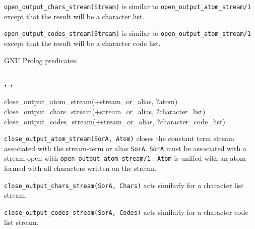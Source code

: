 \texttt{open\_output\_chars\_stream(Stream)} is similar to
\texttt{open\_output\_atom\_stream/1} except that the result will be a
character list.

\texttt{open\_output\_codes\_stream(Stream)} is similar to
\texttt{open\_output\_atom\_stream/1} except that the result will be a
character code list.

\begin{PlErrors}


\end{PlErrors}

\Portability

GNU Prolog predicates.

\subsubsection{,\label{close-output-atom-stream/2}
               , \\
               }


\begin{TemplatesOneCol}
close\_output\_atom\_stream(+stream\_or\_alias, ?atom)\\
close\_output\_chars\_stream(+stream\_or\_alias, ?character\_list)\\
close\_output\_codes\_stream(+stream\_or\_alias, ?character\_code\_list)

\end{TemplatesOneCol}

\Description

\texttt{close\_output\_atom\_stream(SorA, Atom)} closes the constant term
stream associated with the stream-term or alias \texttt{SorA}. \texttt{SorA} must
be associated with a stream open with \texttt{open\_output\_atom\_stream/1}
.  \texttt{Atom} is unified with an atom
formed with all characters written on the stream.

\texttt{close\_output\_chars\_stream(SorA, Chars)} acts similarly for a
character list stream.

\texttt{close\_output\_codes\_stream(SorA, Codes)} acts similarly for a
character code list stream.

